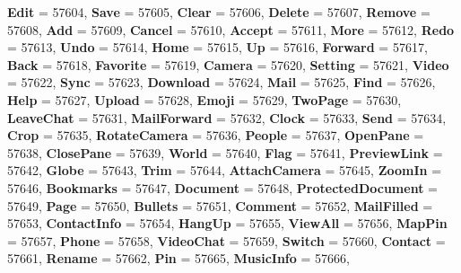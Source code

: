 \begin{DoxyCompactItemize}
{\bfseries Edit} = 57604, 
\newline
{\bfseries Save} = 57605, 
{\bfseries Clear} = 57606, 
{\bfseries Delete} = 57607, 
{\bfseries Remove} = 57608, 
\newline
{\bfseries Add} = 57609, 
{\bfseries Cancel} = 57610, 
{\bfseries Accept} = 57611, 
{\bfseries More} = 57612, 
\newline
{\bfseries Redo} = 57613, 
{\bfseries Undo} = 57614, 
{\bfseries Home} = 57615, 
{\bfseries Up} = 57616, 
\newline
{\bfseries Forward} = 57617, 
{\bfseries Back} = 57618, 
{\bfseries Favorite} = 57619, 
{\bfseries Camera} = 57620, 
\newline
{\bfseries Setting} = 57621, 
{\bfseries Video} = 57622, 
{\bfseries Sync} = 57623, 
{\bfseries Download} = 57624, 
\newline
{\bfseries Mail} = 57625, 
{\bfseries Find} = 57626, 
{\bfseries Help} = 57627, 
{\bfseries Upload} = 57628, 
\newline
{\bfseries Emoji} = 57629, 
{\bfseries Two\+Page} = 57630, 
{\bfseries Leave\+Chat} = 57631, 
{\bfseries Mail\+Forward} = 57632, 
\newline
{\bfseries Clock} = 57633, 
{\bfseries Send} = 57634, 
{\bfseries Crop} = 57635, 
{\bfseries Rotate\+Camera} = 57636, 
\newline
{\bfseries People} = 57637, 
{\bfseries Open\+Pane} = 57638, 
{\bfseries Close\+Pane} = 57639, 
{\bfseries World} = 57640, 
\newline
{\bfseries Flag} = 57641, 
{\bfseries Preview\+Link} = 57642, 
{\bfseries Globe} = 57643, 
{\bfseries Trim} = 57644, 
\newline
{\bfseries Attach\+Camera} = 57645, 
{\bfseries Zoom\+In} = 57646, 
{\bfseries Bookmarks} = 57647, 
{\bfseries Document} = 57648, 
\newline
{\bfseries Protected\+Document} = 57649, 
{\bfseries Page} = 57650, 
{\bfseries Bullets} = 57651, 
{\bfseries Comment} = 57652, 
\newline
{\bfseries Mail\+Filled} = 57653, 
{\bfseries Contact\+Info} = 57654, 
{\bfseries Hang\+Up} = 57655, 
{\bfseries View\+All} = 57656, 
\newline
{\bfseries Map\+Pin} = 57657, 
{\bfseries Phone} = 57658, 
{\bfseries Video\+Chat} = 57659, 
{\bfseries Switch} = 57660, 
\newline
{\bfseries Contact} = 57661, 
{\bfseries Rename} = 57662, 
{\bfseries Pin} = 57665, 
{\bfseries Music\+Info} = 57666, 
\newline

\end{DoxyCompactItemize}
